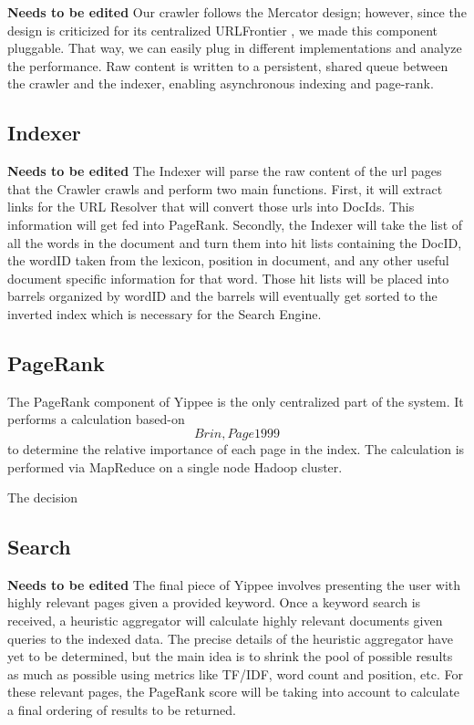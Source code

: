 \documentclass[11pt, letterpaper, oneside, twocolumn]{article}
\begin{document}
\textbf{Needs to be edited}
Our crawler follows the Mercator design\cite{mercator}; however, since the design is
criticized for its centralized URLFrontier \cite{ubi,para}, we made this
component pluggable. That  way, we can easily plug in different implementations 
and analyze the  performance. Raw content  is  written to a persistent, shared queue  
between the crawler and  the indexer, enabling
asynchronous indexing and page-rank.

\subsection{Indexer}

\textbf{Needs to be edited}
The Indexer will parse the raw content of the url pages that the Crawler crawls and perform two
main functions. First, it will extract links for the URL Resolver that will
convert those urls into DocIds. This information will get fed into PageRank.
Secondly, the Indexer will take the list of all the words in the document and
turn them into hit lists containing the DocID, the wordID taken from the lexicon, position in document, and any other useful document specific information for that word. Those hit lists will be placed into barrels organized by wordID and the barrels will eventually get sorted to the inverted index which is necessary for the Search Engine.

\subsection{PageRank}

The PageRank component of Yippee is the only centralized part of the system. It performs a calculation based-on \[Brin, Page 1999\]\cite{pagerank} to determine the relative importance of each page in the index. The calculation is performed via MapReduce on a single node Hadoop cluster.

The decision 

\subsection{Search}
\textbf{Needs to be edited}
The final piece of Yippee involves presenting the user with highly relevant pages given a provided keyword. Once a keyword search is received, a heuristic aggregator will calculate highly relevant documents given queries to the indexed data. The precise details of the heuristic aggregator have yet to be determined, but the main idea is to shrink the pool of possible results as much as possible using metrics like TF/IDF, word count and position, etc.  For these relevant pages, the PageRank score will be taking into account to calculate a final ordering of results to be returned.
\end{document}
